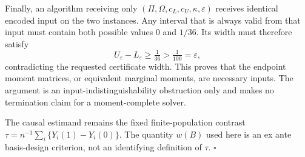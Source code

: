 Finally, an algorithm receiving only \((\Pi,\Omega,c_L,c_U,\kappa,\varepsilon)\) receives identical encoded input on the two instances.  Any interval that is always valid from that input must contain both possible values \(0\) and \(1/36\).  Its width must therefore satisfy
\[
U_\varepsilon-L_\varepsilon\ge\tfrac1{36}>\tfrac1{100}=\varepsilon,
\]
contradicting the requested certificate width.  This proves that the endpoint moment matrices, or equivalent marginal moments, are necessary inputs.  The argument is an input-indistinguishability obstruction only and makes no termination claim for a moment-complete solver.

The causal estimand remains the fixed finite-population contrast \(\tau=n^{-1}\sum_i\{Y_i(1)-Y_i(0)\}\).  The quantity \(w(B)\) used here is an ex ante basis-design criterion, not an identifying definition of \(\tau\).  \(\square\)